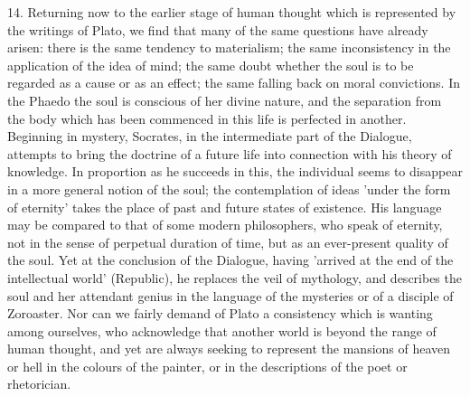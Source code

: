 14. Returning now to the earlier stage of human thought which is
represented by the writings of Plato, we find that many of the same
questions have already arisen: there is the same tendency to materialism;
the same inconsistency in the application of the idea of mind; the same
doubt whether the soul is to be regarded as a cause or as an effect; the
same falling back on moral convictions. In the Phaedo the soul is
conscious of her divine nature, and the separation from the body which has
been commenced in this life is perfected in another. Beginning in mystery,
Socrates, in the intermediate part of the Dialogue, attempts to bring the
doctrine of a future life into connection with his theory of knowledge. In
proportion as he succeeds in this, the individual seems to disappear in a
more general notion of the soul; the contemplation of ideas 'under the
form of eternity' takes the place of past and future states of existence.
His language may be compared to that of some modern philosophers, who
speak of eternity, not in the sense of perpetual duration of time, but as
an ever-present quality of the soul. Yet at the conclusion of the
Dialogue, having 'arrived at the end of the intellectual world'
(Republic), he replaces the veil of mythology, and describes the soul and
her attendant genius in the language of the mysteries or of a disciple of
Zoroaster. Nor can we fairly demand of Plato a consistency which is
wanting among ourselves, who acknowledge that another world is beyond the
range of human thought, and yet are always seeking to represent the
mansions of heaven or hell in the colours of the painter, or in the
descriptions of the poet or rhetorician.


